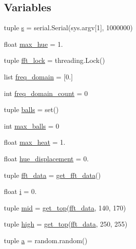 \subsection*{Variables}
\begin{DoxyCompactItemize}
\item 
tuple \hyperlink{namespacelampa4_afcee0cb8e2f362c76be874971642e643}{s} = serial.\+Serial(sys.\+argv\mbox{[}1\mbox{]}, 1000000)
\item 
float \hyperlink{namespacelampa4_ab7c57ff13fd458647c91f06273313483}{max\+\_\+hue} = 1.
\item 
tuple \hyperlink{namespacelampa4_a81b2d75595cdc20eb54c714c56bfd08f}{fft\+\_\+lock} = threading.\+Lock()
\item 
list \hyperlink{namespacelampa4_a369a8a502d6759251af2acd22c697570}{freq\+\_\+domain} = \mbox{[}0.\mbox{]}
\item 
int \hyperlink{namespacelampa4_a58a7d2d077bc3d30265e199521b68f65}{freq\+\_\+domain\+\_\+count} = 0
\item 
tuple \hyperlink{namespacelampa4_a961cb8be928e4a946445985d96c435c4}{balls} = set()
\item 
int \hyperlink{namespacelampa4_a95eb3600d592e7afc11601b525431042}{max\+\_\+balls} = 0
\item 
float \hyperlink{namespacelampa4_abef701f3b350dc684c18349419f0d6f3}{max\+\_\+heat} = 1.
\item 
float \hyperlink{namespacelampa4_a9dd69141d6b812cd877ac90a67624691}{hue\+\_\+displacement} = 0.
\item 
tuple \hyperlink{namespacelampa4_a3b522b28f99168d8af9b8909e20143a7}{fft\+\_\+data} = \hyperlink{namespacelampa4_ac033591ccd7b5c401328e4ff91a88288}{get\+\_\+fft\+\_\+data}()
\item 
float \hyperlink{namespacelampa4_aa1a8ba53cf446fec1b46e2dc8a9dcf15}{i} = 0.
\item 
tuple \hyperlink{namespacelampa4_a67965ded9d0d78e4f7e769861b4960d6}{mid} = \hyperlink{namespacelampa4_afd96591ceedfb79781d917a91760592e}{get\+\_\+top}(\hyperlink{namespacelampa4_a3b522b28f99168d8af9b8909e20143a7}{fft\+\_\+data}, 140, 170)
\item 
tuple \hyperlink{namespacelampa4_a9b2d9b19816e848a68cbc261d8ded396}{high} = \hyperlink{namespacelampa4_afd96591ceedfb79781d917a91760592e}{get\+\_\+top}(\hyperlink{namespacelampa4_a3b522b28f99168d8af9b8909e20143a7}{fft\+\_\+data}, 250, 255)
\item 
tuple \hyperlink{namespacelampa4_aeb667c7d17ba0999dad7c1f3d3aa6d7a}{a} = random.\+random()

\end{DoxyCompactItemize}
